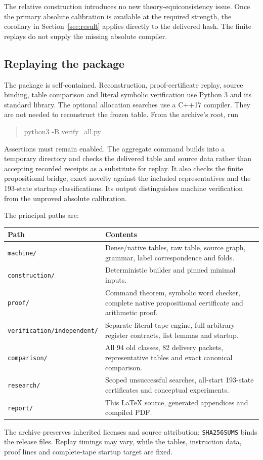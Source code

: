 \documentclass[11pt,letterpaper]{article}
\newcommand{\file}[1]{\texttt{\nolinkurl{#1}}}
\begin{document}
The relative construction introduces no new theory-equiconsistency issue.
Once the primary absolute calibration is available at the required strength,
the corollary in Section~\ref{sec:result} applies directly to the delivered
hash. The finite replays do not supply the missing absolute compiler.

\subsection{Replaying the package}

The package is self-contained. Reconstruction, proof-certificate replay,
source binding, table comparison and literal symbolic verification use
Python 3 and its standard library. The optional allocation searches use
a C++17 compiler. They are not needed to reconstruct the frozen table.
From the archive's root, run
\begin{quote}\ttfamily
python3 -B verify\_all.py
\end{quote}
Assertions must remain enabled. The aggregate command builds into a
temporary directory and checks the delivered table and source data rather
than accepting recorded receipts as a substitute for replay. It also
checks the finite propositional bridge, exact novelty against the included
representatives and the 193-state startup classifications. Its output
distinguishes machine verification from the unproved absolute calibration.

The principal paths are:
\begin{center}\small
\begin{tabularx}{\linewidth}{@{}lX@{}}
\toprule Path & Contents\\\midrule
\file{machine/} & Dense/native tables, raw table, source graph, grammar,
 label correspondence and folds.\\
\file{construction/} & Deterministic builder and pinned minimal inputs.\\
\file{proof/} & Command theorem, symbolic word checker, complete native
 propositional certificate and arithmetic proof.\\
\file{verification/independent/} & Separate literal-tape engine, full
 arbitrary-register contracts, list lemmas and startup.\\
\file{comparison/} & All 94 old classes, 82 delivery packets, representative
 tables and exact canonical comparison.\\
\file{research/} & Scoped unsuccessful searches, all-start 193-state
 certificates and conceptual experiments.\\
\file{report/} & This LaTeX source, generated appendices and compiled PDF.\\
\bottomrule
\end{tabularx}
\end{center}
The archive preserves inherited licenses and source attribution;
\file{SHA256SUMS} binds the release files. Replay timings may vary, while
the tables, instruction data, proof lines and complete-tape startup target
are fixed.
\end{document}
